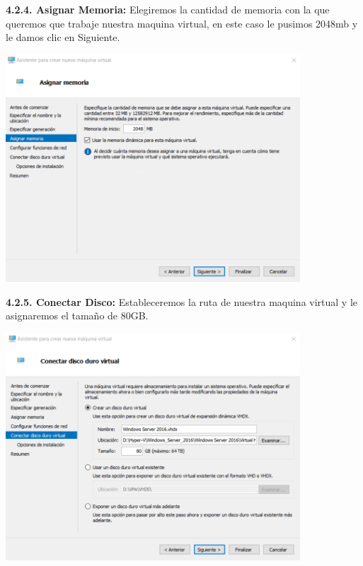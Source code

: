 \textbf {4.2.4. Asignar Memoria:} Elegiremos la cantidad de memoria con la que queremos que trabaje nuestra maquina virtual, en este caso le pusimos 2048mb y le damos clic en Siguiente.
\begin{center}
  \includegraphics[width=11cm]{Imagenes/Asignar_Memoria.png}
\end{center}
\break

\textbf {4.2.5. Conectar Disco:} Estableceremos la ruta de nuestra maquina virtual y le asignaremos el tamaño de 80GB.
\begin{center}
  \includegraphics[width=11cm]{Imagenes/Conectar_Disco.png}
\end{center}

